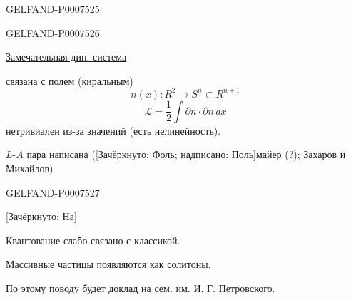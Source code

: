 \begin{GelfandAdjacentEvidence}{GELFAND-P000752}{5}

\end{GelfandAdjacentEvidence}
\begin{GelfandAdjacentEvidence}{GELFAND-P000752}{6}


\underline{Замечательная дин. система}

связана с полем (киральным)
\begin{equation*}
n(x):R^2\longrightarrow S^n\subset R^{n+1}
\tag{50}
\end{equation*}
\begin{equation*}
\mathcal L=\frac12\int\partial n\cdot\partial n\,dx
\tag{51}
\end{equation*}
нетривиален из-за значений (есть нелинейность).

\(L\)-\(A\) пара написана ([Зачёркнуто: Фоль; надписано: Поль]майер (?); Захаров и Михайлов)
\end{GelfandAdjacentEvidence}
\begin{GelfandAdjacentEvidence}{GELFAND-P000752}{7}


[Зачёркнуто: На]
\end{GelfandAdjacentEvidence}

Квантование слабо связано с классикой.

Массивные частицы появляются как солитоны.

По этому поводу будет доклад на сем. им. И. Г. Петровского.


